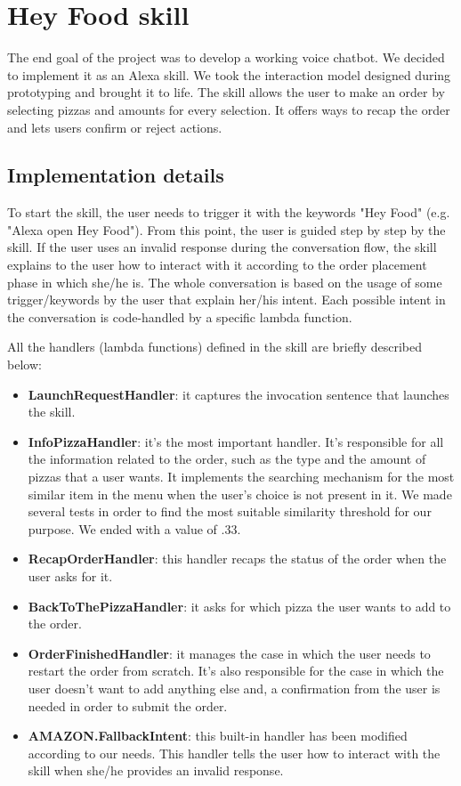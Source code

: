 \section{Hey Food skill}
The end goal of the project was to develop a working voice chatbot.
We decided to implement it as an Alexa skill. We took the interaction model designed during prototyping and brought it to life. The skill allows the user to make an order by selecting pizzas and amounts for every selection. It offers ways to recap the order and lets users confirm or reject actions.

\subsection{Implementation details}

To start the skill, the user needs to trigger it with the keywords "Hey Food" (e.g. "Alexa open Hey Food").
From this point, the user is guided step by step by the skill. If the user uses an invalid response during the conversation flow, the skill explains to the user how to interact with it according to the order placement phase in which she/he is.
The whole conversation is based on the usage of some trigger/keywords by the user that explain her/his intent. Each possible intent in the conversation is code-handled by a specific lambda function. 

All the handlers (lambda functions) defined in the skill are briefly described below:

\begin{itemize}

    \item \textbf{LaunchRequestHandler}: it captures the invocation sentence that launches the skill.
    \item \textbf{InfoPizzaHandler}: it's the most important handler. It's responsible for all the information related to the order, such as the type and the amount of pizzas that a user wants. It implements the searching mechanism for the most similar item in the menu when the user's choice is not present in it. We made several tests in order to find the most suitable similarity threshold for our purpose. We ended with a value of .33.
    \item \textbf{RecapOrderHandler}: this handler recaps the status of the order when the user asks for it.
    \item \textbf{BackToThePizzaHandler}: it asks for which pizza the user wants to add to the order.
    \item \textbf{OrderFinishedHandler}: it manages the case in which the user needs to restart the order from scratch. It's also responsible for the case in which the user doesn't want to add anything else and, a confirmation from the user is needed in order to submit the order.
    \item \textbf{AMAZON.FallbackIntent}: this built-in handler has been modified according to our needs. This handler tells the user how to interact with the skill when she/he provides an invalid response.
    
\end{itemize}

